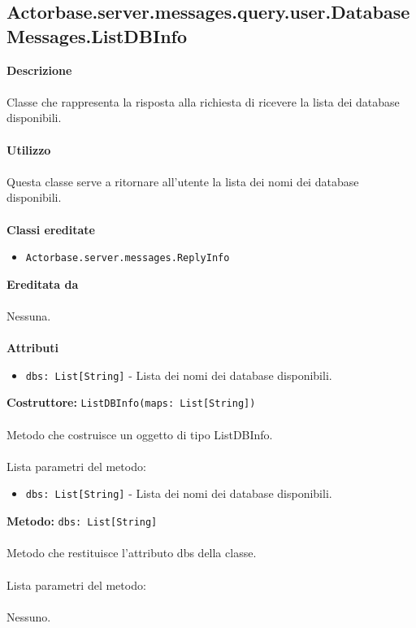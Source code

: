 \documentclass[a4paper]{article}
\begin{document}
	\subsection{Actorbase.server.messages.query.user.DatabaseMessages.ListDBInfo}
		\textbf{Descrizione}
			\\ \\
		Classe che rappresenta la risposta alla richiesta di ricevere la lista dei database disponibili.
			\\ \\
		\textbf{Utilizzo}
			\\ \\
		Questa classe serve a ritornare all'utente la lista dei nomi dei database disponibili.
			\\ \\
		\textbf{Classi ereditate}
			\begin{itemize}
				\item \texttt{Actorbase.server.messages.ReplyInfo }
			\end{itemize}
		\textbf{Ereditata da}
			\\ \\
			Nessuna.
			\\ \\
		\textbf{Attributi}
			\begin{itemize}
				\item \texttt{dbs: List[String]} - Lista dei nomi dei database disponibili.
			\end{itemize}
		\textbf{Costruttore: }\texttt{ListDBInfo(maps: List[String])}
			\\ \\
		Metodo che costruisce un oggetto di tipo ListDBInfo.
			\\ \\
		Lista parametri del metodo:
			\begin{itemize}
				\item \texttt{dbs: List[String]} - Lista dei nomi dei database disponibili.
			\end{itemize}
		\textbf{Metodo: }\texttt{dbs: List[String]}
			\\ \\
		Metodo che restituisce l'attributo dbs della classe.
			\\ \\
		Lista parametri del metodo:
			\\ \\
			Nessuno.
			
\end{document}
